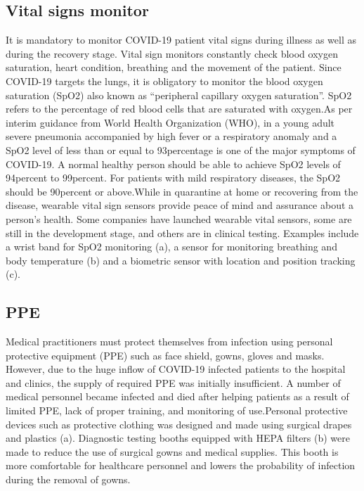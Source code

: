 \documentclass{article}
\begin{document}
 \subsection{Vital signs monitor }
 It is mandatory to monitor COVID-19 patient vital signs during illness as well as during the recovery stage.  Vital sign monitors constantly check blood oxygen saturation, heart condition, breathing and the movement of the patient.  Since COVID-19 targets the lungs, it is obligatory to monitor the blood oxygen saturation (SpO2) also known as “peripheral capillary oxygen saturation”.  SpO2 refers to the percentage of red blood cells that are saturated with oxygen.As per interim guidance from World Health Organization (WHO), in a young adult severe pneumonia accompanied by high fever or a respiratory anomaly and a SpO2 level of less than or equal to 93percentage is one of the major symptoms of COVID-19.  A normal healthy person should be able to achieve SpO2 levels of 94percent to 99percent. For patients with mild respiratory diseases, the SpO2 should be 90percent or above.While in quarantine at home or recovering from the disease, wearable vital sign sensors provide peace of mind and assurance about a person’s health.  Some companies have launched wearable vital sensors, some are still in the development stage, and others are in clinical testing.  Examples include a wrist band for SpO2 monitoring (a), a sensor for monitoring breathing and body temperature (b) and a biometric sensor with location and position tracking (c).
 \subsection{ PPE}
 Medical practitioners must protect themselves from infection using personal protective equipment (PPE) such as face shield, gowns, gloves and masks.    However, due to the huge inflow of COVID-19 infected patients to the hospital and clinics, the supply of required PPE was initially insufficient. A number of medical personnel became infected and died after helping patients as a result of limited PPE, lack of proper training, and monitoring of use.Personal protective devices such as protective clothing was designed and made using surgical drapes and plastics (a).   Diagnostic testing booths equipped with HEPA filters (b) were made to reduce the use of   surgical gowns and medical supplies. This booth is more comfortable for healthcare personnel and lowers the probability of infection during the removal of gowns.
\end{document}
